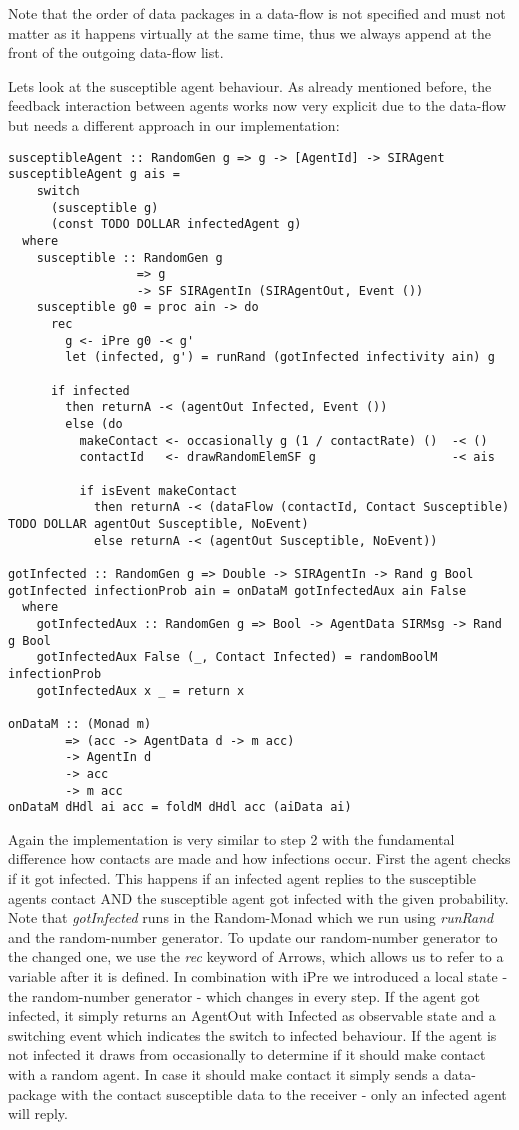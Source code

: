 Note that the order of data packages in a data-flow is not specified and must not matter as it happens virtually at the same time, thus we always append at the front of the outgoing data-flow list.

Lets look at the susceptible agent behaviour. As already mentioned before, the feedback interaction between agents works now very explicit due to the data-flow but needs a different approach in our implementation:

\begin{verbatim}
susceptibleAgent :: RandomGen g => g -> [AgentId] -> SIRAgent
susceptibleAgent g ais = 
    switch 
      (susceptible g) 
      (const TODO DOLLAR infectedAgent g)
  where
    susceptible :: RandomGen g 
                  => g 
                  -> SF SIRAgentIn (SIRAgentOut, Event ())
    susceptible g0 = proc ain -> do
      rec
        g <- iPre g0 -< g'
        let (infected, g') = runRand (gotInfected infectivity ain) g

      if infected 
        then returnA -< (agentOut Infected, Event ())
        else (do
          makeContact <- occasionally g (1 / contactRate) ()  -< ()
          contactId   <- drawRandomElemSF g                   -< ais

          if isEvent makeContact
            then returnA -< (dataFlow (contactId, Contact Susceptible) TODO DOLLAR agentOut Susceptible, NoEvent)
            else returnA -< (agentOut Susceptible, NoEvent))
            
gotInfected :: RandomGen g => Double -> SIRAgentIn -> Rand g Bool
gotInfected infectionProb ain = onDataM gotInfectedAux ain False
  where
    gotInfectedAux :: RandomGen g => Bool -> AgentData SIRMsg -> Rand g Bool
    gotInfectedAux False (_, Contact Infected) = randomBoolM infectionProb
    gotInfectedAux x _ = return x
    
onDataM :: (Monad m) 
        => (acc -> AgentData d -> m acc) 
        -> AgentIn d 
        -> acc 
        -> m acc
onDataM dHdl ai acc = foldM dHdl acc (aiData ai)
\end{verbatim}

Again the implementation is very similar to step 2 with the fundamental difference how contacts are made and how infections occur. First the agent checks if it got infected. This happens if an infected agent replies to the susceptible agents contact AND the susceptible agent got infected with the given probability. Note that \textit{gotInfected} runs in the Random-Monad which we run using \textit{runRand} and the random-number generator. To update our random-number generator to the changed one, we use the \textit{rec} keyword of Arrows, which allows us to refer to a variable after it is defined. In combination with iPre we introduced a local state - the random-number generator - which changes in every step.
If the agent got infected, it simply returns an AgentOut with Infected as observable state and a switching event which indicates the switch to infected behaviour.
If the agent is not infected it draws from occasionally to determine if it should make contact with a random agent. In case it should make contact it simply sends a data-package with the contact susceptible data to the receiver - only an infected agent will reply.

